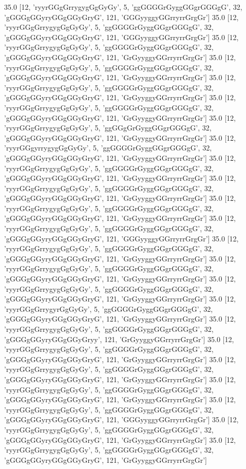 35.0 [12, 'ryyrGGgGrrygygGgGyGy', 5, 'ggGGGGrGyggGGgrGGGgG', 32, 'gGGGgGGyryGGgGGyGryG', 121, 'GGGyyggyGGrryrrGrgGr']
35.0 [12, 'ryyrGGgGrrygygGgGyGy', 5, 'ggGGGGrGyggGGgrGGGgG', 32, 'gGGGgGGyryGGgGGyGryG', 121, 'GGGyyggyGGrryrrGrgGr']
35.0 [12, 'ryyrGGgGrrygygGgGyGy', 5, 'ggGGGGrGyggGGgrGGGgG', 32, 'gGGGgGGyryGGgGGyGryG', 121, 'GrGyyggyGGrryrrGrgGr']
35.0 [12, 'ryyrGGgGrrygygGgGyGy', 5, 'ggGGGGrGyggGGgrGGGgG', 32, 'gGGGgGGyryGGgGGyGryG', 121, 'GrGyyggyGGrryrrGrgGr']
35.0 [12, 'ryyrGGgGrrygygGgGyGy', 5, 'ggGGGGrGyggGGgrGGGgG', 32, 'gGGGgGGyryGGgGGyGryG', 121, 'GrGyyggyGGrryrrGrgGr']
35.0 [12, 'ryyrGGgGrrygygGgGyGy', 5, 'ggGGGGrGyggGGgrGGGgG', 32, 'gGGGgGGyryGGgGGyGryG', 121, 'GrGyyggyGGrryrrGrgGr']
35.0 [12, 'ryyrGGgGrrygygGgGyGy', 5, 'ggGGgGrGyggGGgrGGGgG', 32, 'gGGGgGGyryGGgGGyGryG', 121, 'GrGyyggyGGrryrrGrgGr']
35.0 [12, 'ryyrGGgyrrygygGgGyGy', 5, 'ggGGGGrGyggGGgrGGGgG', 32, 'gGGGgGGyryGGgGGyGryG', 121, 'GrGyyggyGGrryrrGrgGr']
35.0 [12, 'ryyrGGgGrrygygGgGyGy', 5, 'ggGGGGrGyggGGgrGGGgG', 32, 'gGGGgGGyryGGgGGyGryG', 121, 'GrGyyggyGGrryrrGrgGr']
35.0 [12, 'ryyrGGgGrrygygGgGyGy', 5, 'ggGGGGrGyggGGgrGGGgG', 32, 'gGGGgGGyryGGgGGyGryG', 121, 'GrGyyggyGGrryrrGrgGr']
35.0 [12, 'ryyrGGgGrrygygGgGyGy', 5, 'ggGGGGrGyggGGgrGGGgG', 32, 'gGGGgGGyryGGgGGyGryG', 121, 'GrGyyggyGGrryrrGrgGr']
35.0 [12, 'ryyrGGgGrrygygGgGyGy', 5, 'ggGGGGrGyggGGgrGGGgG', 32, 'gGGGgGGyryGGgGGyGryG', 121, 'GGGyyggyGGrryrrGrgGr']
35.0 [12, 'ryyrGGgGrrygygGgGyGy', 5, 'ggGGGGrGyggGGgrGGGgG', 32, 'gGGGgGGyryGGgGGyGryG', 121, 'GrGyyggyGGrryrrGrgGr']
35.0 [12, 'ryyrGGgGrrygygGgGyGy', 5, 'ggGGGGrGyggGGgrGGGgG', 32, 'gGGGgGGyryGGgGGyGryG', 121, 'GrGyyggyGGrryrrGrgGr']
35.0 [12, 'ryyrGGgGrrygygGgGyGy', 5, 'ggGGGGrGyggGGgrGGGgG', 32, 'gGGGgGGyryGGgGGyGryG', 121, 'GrGyyggyGGrryrrGrgGr']
35.0 [12, 'ryyrGGgGrrygyrGgGyGy', 5, 'ggGGGGrGyggGGgrGGGgG', 32, 'gGGGgGGyryGGgGGyGryG', 121, 'GrGyyggyGGrryrrGrgGr']
35.0 [12, 'ryyrGGgGrrygygGgGyGy', 5, 'ggGGGGrGyggGGgrGGGgG', 32, 'gGGGgGGyryGGgGGyGryy', 121, 'GrGyyggyGGrryrrGrgGr']
35.0 [12, 'ryyrGGgGrrygygGgGyGy', 5, 'ggGGGGrGyggGGgrGGGgG', 32, 'gGGGgGGyryGGgGGyGryG', 121, 'GrGyyggyGGrryrrGrgGr']
35.0 [12, 'ryyrGGgGrrygygGgGyGy', 5, 'ggGGGGrGyggGGgrGGGgG', 32, 'gGGGgGGyryGGgGGyGryG', 121, 'GrGyyggyGGrryrrGrgGr']
35.0 [12, 'ryyrGGgGrrygygGgGyGy', 5, 'ggGGGGrGyggGGgrGGGgG', 32, 'gGGGgGGyryGGgGGyGryG', 121, 'GrGyyggyGGrryrrGrgGr']
35.0 [12, 'ryyrGGgGrrygygGgGyGy', 5, 'ggGGGGrGyggGGgrGGGgG', 32, 'gGGGgGGyryGGgGGyGryG', 121, 'GGGyyggyGGrryrrGrgGr']
35.0 [12, 'ryyrGGgGrrygygGgGyGy', 5, 'ggGGGGrGyggGGgrGGGgG', 32, 'gGGGgGGyryGGgGGyGryG', 121, 'GrGyyggyGGrryrrGrgGr']
35.0 [12, 'ryyrGGgGrrygygGgGyGy', 5, 'ggGGGGrGyggGGgrGGGgG', 32, 'gGGGgGGyryGGgGGyGryG', 121, 'GrGyyggyGGrryrrGrgGr']
